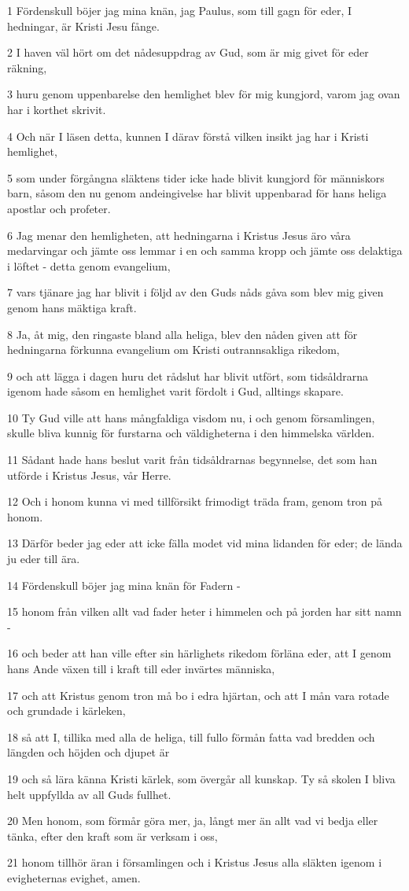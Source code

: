 \par 1 Fördenskull böjer jag mina knän, jag Paulus, som till gagn för eder, I hedningar, är Kristi Jesu fånge.
\par 2 I haven väl hört om det nådesuppdrag av Gud, som är mig givet för eder räkning,
\par 3 huru genom uppenbarelse den hemlighet blev för mig kungjord, varom jag ovan har i korthet skrivit.
\par 4 Och när I läsen detta, kunnen I därav förstå vilken insikt jag har i Kristi hemlighet,
\par 5 som under förgångna släktens tider icke hade blivit kungjord för människors barn, såsom den nu genom andeingivelse har blivit uppenbarad för hans heliga apostlar och profeter.
\par 6 Jag menar den hemligheten, att hedningarna i Kristus Jesus äro våra medarvingar och jämte oss lemmar i en och samma kropp och jämte oss delaktiga i löftet - detta genom evangelium,
\par 7 vars tjänare jag har blivit i följd av den Guds nåds gåva som blev mig given genom hans mäktiga kraft.
\par 8 Ja, åt mig, den ringaste bland alla heliga, blev den nåden given att för hedningarna förkunna evangelium om Kristi outrannsakliga rikedom,
\par 9 och att lägga i dagen huru det rådslut har blivit utfört, som tidsåldrarna igenom hade såsom en hemlighet varit fördolt i Gud, alltings skapare.
\par 10 Ty Gud ville att hans mångfaldiga visdom nu, i och genom församlingen, skulle bliva kunnig för furstarna och väldigheterna i den himmelska världen.
\par 11 Sådant hade hans beslut varit från tidsåldrarnas begynnelse, det som han utförde i Kristus Jesus, vår Herre.
\par 12 Och i honom kunna vi med tillförsikt frimodigt träda fram, genom tron på honom.
\par 13 Därför beder jag eder att icke fälla modet vid mina lidanden för eder; de lända ju eder till ära.
\par 14 Fördenskull böjer jag mina knän för Fadern -
\par 15 honom från vilken allt vad fader heter i himmelen och på jorden har sitt namn -
\par 16 och beder att han ville efter sin härlighets rikedom förläna eder, att I genom hans Ande växen till i kraft till eder invärtes människa,
\par 17 och att Kristus genom tron må bo i edra hjärtan, och att I mån vara rotade och grundade i kärleken,
\par 18 så att I, tillika med alla de heliga, till fullo förmån fatta vad bredden och längden och höjden och djupet är
\par 19 och så lära känna Kristi kärlek, som övergår all kunskap. Ty så skolen I bliva helt uppfyllda av all Guds fullhet.
\par 20 Men honom, som förmår göra mer, ja, långt mer än allt vad vi bedja eller tänka, efter den kraft som är verksam i oss,
\par 21 honom tillhör äran i församlingen och i Kristus Jesus alla släkten igenom i evigheternas evighet, amen.

